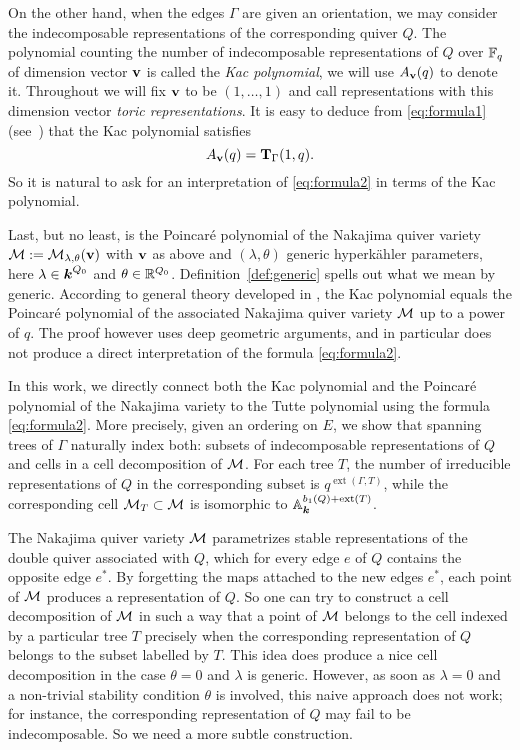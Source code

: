 \documentclass{amsart}
\theoremstyle{definition}
\DeclareMathOperator{\extact}{ext}
\begin{document}
On the other hand, when the edges $\Gamma$ are given an orientation, we may consider the indecomposable representations of the corresponding quiver $Q$.
The polynomial counting the number of indecomposable representations of $Q$ over $\mathbb{F}_q$ of dimension vector $\mathbf{v}$ is called the {\em Kac polynomial}, we will use $A_{\mathbf{v}}(q)$ to denote it.
Throughout we will fix $\mathbf{v}$ to be $(1,\ldots,1)$ and call representations with this dimension vector {\it toric representations}.
It is easy to deduce from \eqref{eq:formula1} (see~\cite{hausel-sturmfels}) that the Kac polynomial satisfies
$$
A_{\mathbf{v}}(q)=\mathbf{T}_\Gamma(1,q).
$$
So it is natural to ask for an interpretation of \eqref{eq:formula2} in terms of the Kac polynomial.

Last, but no least, is the Poincar\'e polynomial of the Nakajima quiver variety $\mathcal{M}:= \mathcal{M}_{\lambda, \theta}(\mathbf{v})$ with $\mathbf{v}$ as above and $(\lambda,\theta)$ generic hyperk\"ahler parameters, here $\lambda \in {\boldsymbol{k}}^{Q_0}$ and $\theta \in \mathbb{R}^{Q_0}$.
Definition~\ref{def:generic} spells out what we mean by generic.
According to general theory developed in \cite{CB-vdB}, the Kac polynomial equals the Poincar\'e polynomial of the associated Nakajima quiver variety $\mathcal{M}$ up to a power of $q$. The proof however uses deep geometric arguments, and in particular does not produce a direct interpretation of the formula \eqref{eq:formula2}.

In this work, we directly connect both the Kac polynomial and the Poincar\'e polynomial of the Nakajima variety to the Tutte polynomial using the formula \eqref{eq:formula2}.
More precisely, given an ordering on $E$, we show that spanning trees of $\Gamma$ naturally index both: subsets of indecomposable representations of $Q$ and cells in a cell decomposition of $\mathcal{M}$. For each tree $T$, the number of irreducible representations of $Q$ in the corresponding subset is $q^{\extact(\Gamma, T)}$, while the corresponding cell $\mathcal{M}_T\subset \mathcal{M}$ is isomorphic to $\bA_{\bk}^{b_1(Q)+\extact(T)}$.

The Nakajima quiver variety $\mathcal{M}$ parametrizes stable representations of the double quiver associated with $Q$, which for every edge $e$ of $Q$ contains the opposite edge $e^*$. By forgetting the maps attached to the new edges $e^*$, each point of $\mathcal{M}$ produces a representation of $Q$. So one can try to construct a cell decomposition of $\mathcal{M}$ in such a way that a point of $\mathcal{M}$ belongs to the cell indexed by a particular tree $T$ precisely when the corresponding representation of $Q$ belongs to the subset labelled by $T$. This idea does produce a nice cell decomposition in the case $\theta=0$ and $\lambda$ is generic. However, as soon as $\lambda=0$ and a non-trivial stability condition $\theta$ is involved, this naive approach does not work; for instance, the corresponding representation of $Q$ may fail to be indecomposable. So we need a more subtle construction.
\end{document}
